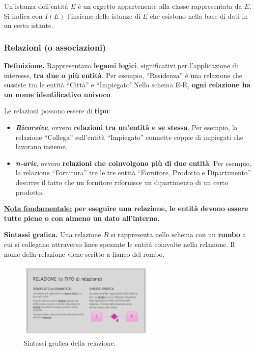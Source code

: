 \documentclass[a4paper]{article}
\newcommand{\dquotes}[1]{``#1''}
\begin{document}
	Un’istanza dell’entità $E$ è un oggetto appartenente alla classe rappresentata da $E$. Si indica con $I(E)$ l’insieme delle istanze di $E$ che esistono nella base di dati in un certo istante.
	
	\newpage
	
	
	
	
	\subsubsection{Relazioni (o associazioni)}\label{relazioni}
	
	\textcolor{Red3}{\textbf{Definizione.}} Rappresentano \textbf{legami logici}, significativi per l'applicazione di interesse, \textbf{tra due o più entità}. Per esempio, \dquotes{Residenza} è una relazione che sussiste tra le entità \dquotes{Città} e \dquotes{Impiegato}.Nello schema E-R, \textbf{ogni relazione ha un nome identificativo univoco}.
	
	\noindent
	Le relazioni possono essere di \textbf{tipo}:
	
	\begin{itemize}
		\item \textbf{\emph{Ricorsive}}, ovvero \textbf{relazioni tra un'entità e se stessa}. Per esempio, la relazione \dquotes{Collega} sull'entità \dquotes{Impiegato} connette coppie di impiegati che lavorano insieme.
		
		\item \textbf{\emph{n-arie}}, ovvero \textbf{relazioni che coinvolgono più di due entità}. Per esempio, la relazione \dquotes{Fornitura} tre le tre entità \dquotes{Fornitore, Prodotto e Dipartimento} descrive il fatto che un fornitore rifornisce un dipartimento di un certo prodotto.
	\end{itemize}

	\noindent
	\textbf{\underline{Nota fondamentale:}} \textbf{per eseguire una relazione, le entità devono essere tutte piene o con almeno un dato all'interno.} \newline
	
	\noindent
	\textcolor{Green4}{\textbf{Sintassi grafica.}} Una relazione $R$ si rappresenta nello schema con un \textbf{rombo} a cui si collegano attraverso linee spezzate le entità coinvolte nella relazione. Il nome della relazione viene scritto a fianco del rombo.
	
	\begin{figure}[!htp]
		\centering
		\includegraphics[width=0.6\textwidth]{img/relazione_def.pdf}
		\caption{Sintassi grafica della relazione.}
	\end{figure}
\end{document}
